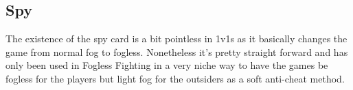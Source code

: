 \subsection{Spy}

The existence of the spy card is a bit pointless in 1v1s as it basically changes the game from normal fog to fogless. Nonetheless it's pretty straight forward and has only been used in Fogless Fighting in a very niche way to have the games be fogless for the players but light fog for the outsiders as a soft anti-cheat method.